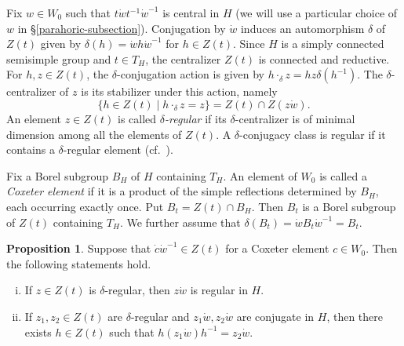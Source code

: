 \documentclass[12pt]{article}
\theoremstyle{definition}
\newtheorem{prop}[theo]{Proposition}
\begin{document}
Fix $w\in W_0$ such that $t\dot w t^{-1}\dot w^{-1}$ is central in $H$ (we will use a particular choice of $w$ in \S\ref{parahoric-subsection}).
Conjugation by $\dot w$ induces an automorphism $\delta$ of $Z(t)$ given by $\delta(h)=\dot w h\dot w^{-1}$ for $h\in Z(t)$.
Since $H$ is a simply connected semisimple group and $t\in T_H$, the centralizer $Z(t)$ is connected and reductive.
For $h,z\in Z(t)$, the $\delta$-conjugation action is given by $h\cdot_{\delta}z=hz\delta(h^{-1})$.
The $\delta$-centralizer of $z$ is its stabilizer under this action, namely
$$
\{h\in Z(t)\mid h\cdot_{\delta}z=z\}=Z(t)\cap Z(z\dot w).
$$
An element $z\in Z(t)$ is called {\it $\delta$-regular} if its $\delta$-centralizer is of minimal dimension among all the elements of $Z(t)$.
A $\delta$-conjugacy class is regular if it contains a $\delta$-regular element (cf.\ \cite[\S1]{HL26}).

Fix a Borel subgroup $B_H$ of $H$ containing $T_H$. An element of $W_0$ is called a {\it Coxeter element} if it is a product of the simple reflections determined by $B_H$, each occurring exactly once.
Put $B_t=Z(t)\cap B_H$.
Then $B_t$ is a Borel subgroup of $Z(t)$ containing $T_H$.
We further assume that $\delta(B_t)=\dot w B_t\dot w^{-1}=B_t$.

\begin{prop}\label{finite-lemma}
Suppose that $\dot c\dot w^{-1}\in Z(t)$ for a Coxeter element $c\in W_0$.
Then the following statements hold.
\begin{enumerate}[(i)]
\item If $z\in Z(t)$ is $\delta$-regular, then $z\dot w$ is regular in $H$.
\item If $z_1,z_2\in Z(t)$ are $\delta$-regular and $z_1\dot w,z_2\dot w$ are conjugate in $H$, then there exists $h\in Z(t)$ such that $h(z_1\dot w)h^{-1}=z_2\dot w$.
\end{enumerate}
\end{prop}
\end{document}

